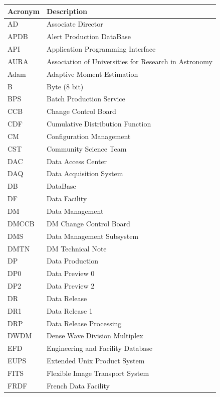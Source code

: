 \addtocounter{table}{-1}
\begin{longtable}{p{}p{}}\hline
\textbf{Acronym} & \textbf{Description}  \\\hline

AD & Associate Director \\\hline
APDB & Alert Production DataBase \\\hline
API & Application Programming Interface \\\hline
AURA & Association of Universities for Research in Astronomy \\\hline
Adam & Adaptive Moment Estimation \\\hline
B & Byte (8 bit) \\\hline
BPS & Batch Production Service \\\hline
CCB & Change Control Board \\\hline
CDF & Cumulative Distribution Function \\\hline
CM & Configuration Management \\\hline
CST & Community Science Team \\\hline
DAC & Data Access Center \\\hline
DAQ & Data Acquisition System \\\hline
DB & DataBase \\\hline
DF & Data Facility \\\hline
DM & Data Management \\\hline
DMCCB & DM Change Control Board \\\hline
DMS & Data Management Subsystem \\\hline
DMTN & DM Technical Note \\\hline
DP & Data Production \\\hline
DP0 & Data Preview 0 \\\hline
DP2 & Data Preview 2 \\\hline
DR & Data Release \\\hline
DR1 & Data Release 1 \\\hline
DRP & Data Release Processing \\\hline
DWDM & Dense Wave Division Multiplex \\\hline
EFD & Engineering and Facility Database \\\hline
EUPS & Extended Unix Product System \\\hline
FITS & Flexible Image Transport System \\\hline
FRDF & French Data Facility \\\hline

\end{longtable}
